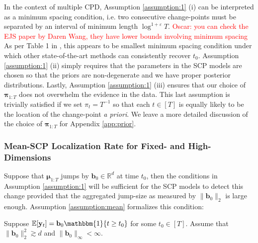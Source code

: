 In the context of multiple CPD, Assumption \ref{assumption:1} (i) can be interpreted as a minimum spacing condition, i.e. two consecutive change-points must be separated by an interval of minimum length $\log^{1+\varepsilon} T$. \textcolor{red}{Oscar: you can check the EJS paper by Daren Wang, they have lower bounds involving minimum spacing  }As per Table 1 in \cite{Cho15}, this appears to be smallest minimum spacing condition under which other state-of-the-art methods can consistently recover $t_0$. Assumption \ref{assumption:1} (ii) simply requires that the parameters in the SCP models are chosen so that the priors are non-degenerate and we have proper posterior distributions. Lastly, Assumption \ref{assumption:1} (iii) ensures that our choice of $\boldsymbol{\pi}_{1:T}$ does not overwhelm the evidence in the data. This last assumption is trivially satisfied if we set $\pi_t = T^{-1}$ so that each $t \in [T]$ is equally likely to be the location of the change-point \textit{a priori}. We leave a more detailed discussion of the choice of $\boldsymbol{\pi}_{1:T}$ for Appendix \ref{app:prior}. 

\subsubsection{Mean-SCP Localization Rate for Fixed- and High-Dimensions}

Suppose that $\boldsymbol{\mu}_{1:T}$ jumps by $\mathbf{b}_0\in\mathbb{R}^d$ at time $t_0$, then the conditions in Assumption \ref{assumption:1} will be sufficient for the SCP models to detect this change provided that the aggregated jump-size as measured by $\lVert \mathbf{b}_0 \rVert_2$ is large enough. Assumption \ref{assumption:mean} formalizes this condition:

\begin{assumption}\label{assumption:mean}  
    Suppose $\E[\mathbf{y}_t] = \mathbf{b}_0\mathbbm{1}\{t \geq t_0\}$ for some $t_0 \in [T]$. Assume that $\lVert \mathbf{b}_0 \rVert^2_2 \gtrsim d$ and $\lVert\mathbf{b}_0\rVert_\infty < \infty$.
\end{assumption}
\vspace{-5pt}

